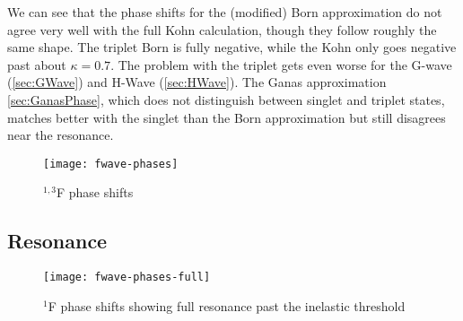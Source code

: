 \documentclass[Dissertation.tex]{subfiles}
\begin{document}
We can see that the phase shifts for the (modified) Born approximation do not 
agree very well with the full Kohn calculation, though they follow roughly 
the same shape. The triplet Born is fully negative, while the Kohn only goes 
negative past about $\kappa = 0.7$. The problem with the triplet gets even 
worse for the G-wave (\cref{sec:GWave}) and H-Wave (\cref{sec:HWave}).
The Ganas approximation \cref{sec:GanasPhase}, which does not distinguish
between singlet and triplet states, matches better with the singlet than the
Born approximation but still disagrees near the resonance.

%

\begin{figure}[H]
	\centering
	\texttt{[image: fwave-phases]}
	\caption{$^{1,3}$F phase shifts}
	\label{fig:FWavePhase}
\end{figure}


\subsection{Resonance}
\label{sec:FWaveResonance}

\begin{figure}[H]
	\centering
	\texttt{[image: fwave-phases-full]}
	\caption[Full $^1$F phase shifts]{$^1$F phase shifts showing full resonance past the inelastic threshold}
	\label{fig:FWavePhaseFull}
\end{figure}
\end{document}
